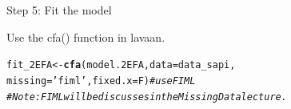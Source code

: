 \documentclass[10pt]{beamer}\usepackage[]{graphicx}\usepackage[]{xcolor}
\makeatletter
\newcommand{\hlstr}[1]{\textcolor[rgb]{0.192,0.494,0.8}{#1}}%
\newcommand{\hlcom}[1]{\textcolor[rgb]{0.678,0.584,0.686}{\textit{#1}}}%
\newcommand{\hlstd}[1]{\textcolor[rgb]{0.345,0.345,0.345}{#1}}%
\newcommand{\hlkwb}[1]{\textcolor[rgb]{0.69,0.353,0.396}{#1}}%
\newcommand{\hlkwc}[1]{\textcolor[rgb]{0.333,0.667,0.333}{#1}}%
\newcommand{\hlkwd}[1]{\textcolor[rgb]{0.737,0.353,0.396}{\textbf{#1}}}%
\newenvironment{kframe}{%
 \def\at@end@of@kframe{}%
 \ifinner\ifhmode%
  \def\at@end@of@kframe{\end{minipage}}%
  \begin{minipage}{\columnwidth}%
 \fi\fi%
 \def\FrameCommand##1{\hskip\@totalleftmargin \hskip-\fboxsep
 \colorbox{shadecolor}{##1}\hskip-\fboxsep
     \hskip-\linewidth \hskip-\@totalleftmargin \hskip\columnwidth}%
 \MakeFramed {\advance\hsize-\width
   \@totalleftmargin\z@ \linewidth\hsize
   \@setminipage}}%
 {\par\unskip\endMakeFramed%
 \at@end@of@kframe}
\newenvironment{knitrout}{}{} %
\makeatother
\begin{document}
%
\begin{frame}[fragile]{Step 5: Fit the model}

Use the cfa() function in lavaan.

\begin{knitrout}
\color{fgcolor}\begin{kframe}
\begin{alltt}
\hlstd{fit_2EFA} \hlkwb{<-} \hlkwd{cfa}\hlstd{(model.2EFA,} \hlkwc{data}\hlstd{=data_sapi,}
                \hlkwc{missing}\hlstd{=}\hlstr{'fiml'}\hlstd{,} \hlkwc{fixed.x}\hlstd{=F)}  \hlcom{# use FIML}
\hlcom{# Note: FIML will be discusses in the Missing Data lecture.}
\end{alltt}
\end{kframe}
\end{knitrout}
\end{frame}
%
\end{document}
